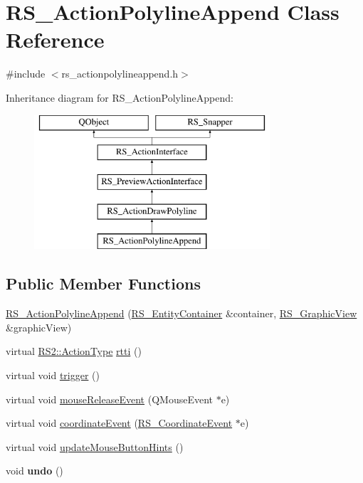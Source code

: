 \hypertarget{classRS__ActionPolylineAppend}{\section{R\-S\-\_\-\-Action\-Polyline\-Append Class Reference}
\label{classRS__ActionPolylineAppend}
}


{\ttfamily \#include $<$rs\-\_\-actionpolylineappend.\-h$>$}

Inheritance diagram for R\-S\-\_\-\-Action\-Polyline\-Append\-:\begin{figure}[H]
\begin{center}
\leavevmode
\includegraphics[height=5.000000cm]{classRS__ActionPolylineAppend}
\end{center}
\end{figure}
\subsection*{Public Member Functions}
\begin{DoxyCompactItemize}
\item 
\hyperlink{classRS__ActionPolylineAppend_a3859f067980d4603b26dc86ccd3c34ea}{R\-S\-\_\-\-Action\-Polyline\-Append} (\hyperlink{classRS__EntityContainer}{R\-S\-\_\-\-Entity\-Container} \&container, \hyperlink{classRS__GraphicView}{R\-S\-\_\-\-Graphic\-View} \&graphic\-View)
\item 
virtual \hyperlink{classRS2_afe3523e0bc41fd637b892321cfc4b9d7}{R\-S2\-::\-Action\-Type} \hyperlink{classRS__ActionPolylineAppend_a03860fa3c5e4165de93cbbfd5958e303}{rtti} ()
\item 
virtual void \hyperlink{classRS__ActionPolylineAppend_ace0b12d971511f421b1abef99694675f}{trigger} ()
\item 
virtual void \hyperlink{classRS__ActionPolylineAppend_a9a4740b0e1bded2cb94329500e91f755}{mouse\-Release\-Event} (Q\-Mouse\-Event $\ast$e)
\item 
virtual void \hyperlink{classRS__ActionPolylineAppend_a8357d7d800ddf4cdb4246357c1971e5d}{coordinate\-Event} (\hyperlink{classRS__CoordinateEvent}{R\-S\-\_\-\-Coordinate\-Event} $\ast$e)
\item 
virtual void \hyperlink{classRS__ActionPolylineAppend_a929aeba09ccd99500d297fc51fe79f8a}{update\-Mouse\-Button\-Hints} ()
\item 
\hypertarget{classRS__ActionPolylineAppend_a45f86e6c3981adfe26a1702b74375011}{void {\bfseries undo} ()}\label{classRS__ActionPolylineAppend_a45f86e6c3981adfe26a1702b74375011}

\end{DoxyCompactItemize}
